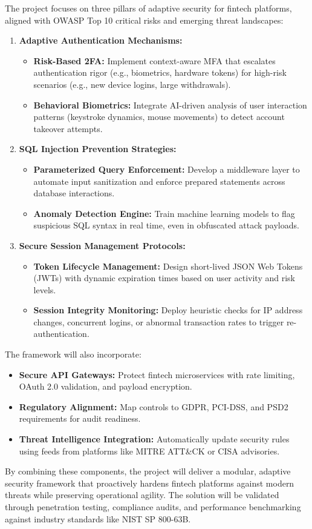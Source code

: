 The project focuses on three pillars of adaptive security for fintech platforms, aligned with OWASP Top 10 critical risks and emerging threat landscapes:

\begin{enumerate}
\item \textbf{Adaptive Authentication Mechanisms:}
\begin{itemize}
\item \textbf{Risk-Based 2FA:} Implement context-aware MFA that escalates authentication rigor (e.g., biometrics, hardware tokens) for high-risk scenarios (e.g., new device logins, large withdrawals).
\item \textbf{Behavioral Biometrics:} Integrate AI-driven analysis of user interaction patterns (keystroke dynamics, mouse movements) to detect account takeover attempts.
\end{itemize}
\item \textbf{SQL Injection Prevention Strategies:}  
\begin{itemize}  
    \item \textbf{Parameterized Query Enforcement:} Develop a middleware layer to automate input sanitization and enforce prepared statements across database interactions.  
    \item \textbf{Anomaly Detection Engine:} Train machine learning models to flag suspicious SQL syntax in real time, even in obfuscated attack payloads.  
\end{itemize}  

\item \textbf{Secure Session Management Protocols:}  
\begin{itemize}  
    \item \textbf{Token Lifecycle Management:} Design short-lived JSON Web Tokens (JWTs) with dynamic expiration times based on user activity and risk levels.  
    \item \textbf{Session Integrity Monitoring:} Deploy heuristic checks for IP address changes, concurrent logins, or abnormal transaction rates to trigger re-authentication.  
\end{itemize}  
\end{enumerate}
\noindent
The framework will also incorporate:
\begin{itemize}
\item \textbf{Secure API Gateways:} Protect fintech microservices with rate limiting, OAuth 2.0 validation, and payload encryption.
\item \textbf{Regulatory Alignment:} Map controls to GDPR, PCI-DSS, and PSD2 requirements for audit readiness.
\item \textbf{Threat Intelligence Integration:} Automatically update security rules using feeds from platforms like MITRE ATT\&CK or CISA advisories.
\end{itemize}

\noindent
By combining these components, the project will deliver a modular, adaptive security framework that proactively hardens fintech platforms against modern threats while preserving operational agility. The solution will be validated through penetration testing, compliance audits, and performance benchmarking against industry standards like NIST SP 800-63B.